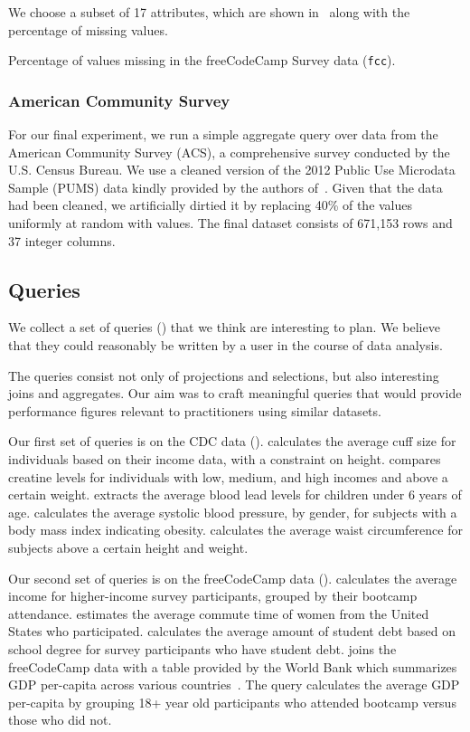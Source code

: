 We choose a subset of 17 attributes, which are shown in~ along
with the percentage of missing values.

\begin{table}
  \centering
  
  \caption{Percentage of values missing in the freeCodeCamp Survey data (\texttt{fcc}).}\label{table:fcc-description} 
\end{table}

\subsubsection{American Community Survey}
For our final experiment, we run a simple aggregate query over data from the American
Community Survey (ACS), a comprehensive survey conducted by the U.S.
Census Bureau. We use a cleaned version of the 2012 Public Use Microdata Sample (PUMS)
data kindly provided by the authors of~\cite{akande2015empirical}. Given that the data had
been cleaned, we artificially dirtied it by replacing 40\% of the values uniformly at random with \nullv{} values.
The final dataset consists of 671,153 rows and 37 integer columns.

\subsection{Queries}
We collect a set of queries () that we think are interesting to plan.
We believe that they could reasonably be written by a user in the course of data analysis.

The queries consist not only of projections and selections, but also
interesting joins and aggregates. Our aim was to craft meaningful queries that would
provide performance figures relevant to practitioners using similar datasets.

Our first set of queries is on the CDC data ().
 calculates the average cuff size for individuals based on their income data, with a constraint on height.
 compares creatine levels for individuals with low, medium, and high incomes and above a certain weight.
 extracts the average blood lead levels for children under 6 years of age.
 calculates the average systolic blood pressure, by gender, for subjects with a body mass index indicating obesity. 
 calculates the average waist circumference for subjects above a certain height and weight.

Our second set of queries is on the freeCodeCamp data ().
 calculates the average income for higher-income survey participants, grouped by their bootcamp attendance.
 estimates the average commute time of women from the United States who participated.
 calculates the average amount of student debt based on school degree for survey participants who have student debt.
 joins the freeCodeCamp data with a table provided by the World Bank which summarizes GDP per-capita across various countries~\cite{worldbank-data}.
The query calculates the average GDP per-capita by grouping 18+ year old participants who attended bootcamp versus those who did not.

